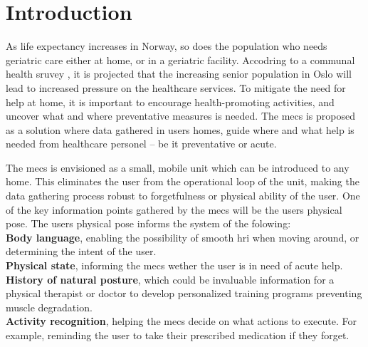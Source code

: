 \chapter{Introduction}




As life expectancy increases in Norway, so does the population who needs geriatric care either at home, or in a geriatric facility. Accodring to a communal health sruvey \cite{oslohelsa}, it is projected that the increasing senior population in Oslo will lead to increased pressure on the healthcare services. To mitigate the need for help at home, it is important to encourage health-promoting activities, and uncover what and where preventative measures is needed. The \gls{mecs} is proposed as a solution where data gathered in users homes, guide where and what help is needed from healthcare personel -- be it preventative or acute.

The \gls{mecs} is envisioned as a small, mobile unit which can be introduced to any home. This eliminates the user from the operational loop of the unit, making the data gathering process robust to forgetfulness or physical ability of the user. One of the key information points gathered by the \gls{mecs} will be the users physical pose. The users physical pose informs the system of the folowing:\\
\textbf{Body language}, enabling the possibility of smooth \gls{hri} when moving around, or determining the intent of the user.\\
\textbf{Physical state}, informing the \gls{mecs} wether the user is in need of acute help.\\
\textbf{History of natural posture}, which could be invaluable information for a physical therapist or doctor to develop personalized training programs preventing muscle degradation.\\
\textbf{Activity recognition}, helping the \gls{mecs} decide on what actions to execute. For example, reminding the user to take their prescribed medication if they forget.

